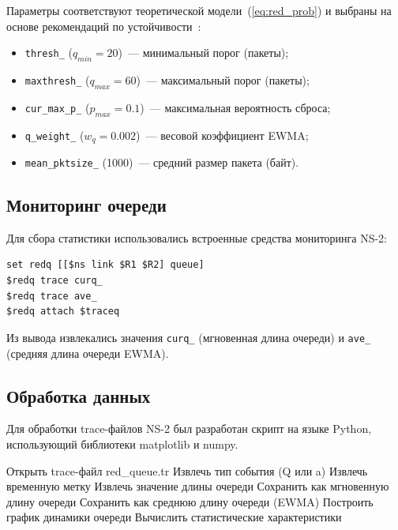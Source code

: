 \documentclass[%
]{ittmm}
\begin{document}
Параметры соответствуют теоретической модели~(\ref{eq:red_prob}) и выбраны на основе рекомендаций по устойчивости~\cite{velieva2019phd}:
\begin{itemize}
  \item \texttt{thresh\_} ($q_{min}=20$)~--- минимальный порог (пакеты);
  \item \texttt{maxthresh\_} ($q_{max}=60$)~--- максимальный порог (пакеты);
  \item \texttt{cur\_max\_p\_} ($p_{max}=0.1$)~--- максимальная вероятность сброса;
  \item \texttt{q\_weight\_} ($w_q=0.002$)~--- весовой коэффициент EWMA;
  \item \texttt{mean\_pktsize\_} (1000)~--- средний размер пакета (байт).
\end{itemize}

\subsection{Мониторинг очереди}

Для сбора статистики использовались встроенные средства мониторинга NS-2:
\begin{verbatim}
set redq [[$ns link $R1 $R2] queue]
$redq trace curq_
$redq trace ave_
$redq attach $traceq
\end{verbatim}

Из вывода извлекались значения \texttt{curq\_} (мгновенная длина очереди) и \texttt{ave\_} (средняя длина очереди EWMA).

\subsection{Обработка данных}

Для обработки trace-файлов NS-2 был разработан скрипт на языке Python, использующий библиотеки matplotlib и numpy.

\begin{algorithm}
  \caption{Алгоритм обработки trace-файла NS-2}
  \begin{algorithmic}[1]
    \STATE Открыть trace-файл red\_queue.tr
    \STATE Извлечь тип события (Q или a)
    \STATE Извлечь временную метку
    \STATE Извлечь значение длины очереди
    \STATE Сохранить как мгновенную длину очереди
    \STATE Сохранить как среднюю длину очереди (EWMA)
    \ENDIF
    \ENDFOR
    \STATE Построить график динамики очереди
    \STATE Вычислить статистические характеристики
  \end{algorithmic}
\end{algorithm}
\end{document}

